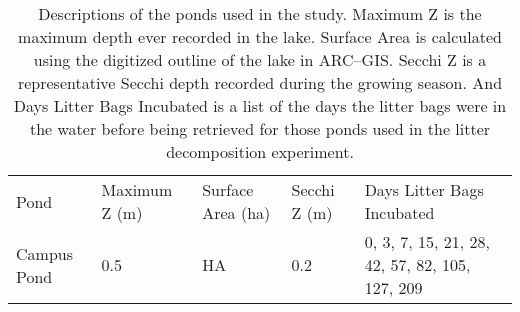 \begin{table}
\label{tab:ponds}
\begin{tabular}{l l l l l}
Pond & Maximum Z (m) & Surface Area (ha) & Secchi Z (m) & Days Litter Bags Incubated \\
Campus Pond & 0.5 & HA & 0.2 & 0, 3, 7, 15, 21, 28, 42, 57, 82, 105, 127, 209\\

\end{tabular}
\caption{Descriptions of the ponds used in the study. Maximum Z is the maximum depth ever recorded in the lake. Surface Area is calculated using the digitized outline of the lake in ARC--GIS. Secchi Z is a representative Secchi depth recorded during the growing season. And Days Litter Bags Incubated is a list of the days the litter bags were in the water before being retrieved for those ponds used in the litter decomposition experiment.}
\end{table}